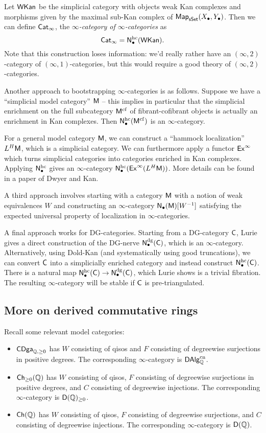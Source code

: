 \documentclass{amsart}
\begin{document}
Let $\mathsf{WKan}$ be the simplicial category with objects weak Kan complexes and morphisms given by the maximal sub-Kan complex of $\mathsf{Map}_{\mathsf{sSet}}(X_\bullet, Y_\bullet)$.
Then we can define $\mathsf{Cat}_\infty$, the \emph{$\infty$-category of $\infty$-categories} as
\[
	\mathsf{Cat}_\infty = \mathsf{N}_\bullet^{\mathrm{hc}}(\mathsf{WKan}).
\]
Note that this construction loses information: we'd really rather have an $(\infty, 2)$-category of $(\infty, 1)$-categories, but this would require a good theory of $(\infty, 2)$-categories.

Another approach to bootstrapping $\infty$-categories is as follows.
Suppose we have a ``simplicial model category'' $\mathsf{M}$ -- this implies in particular that the simplicial enrichment on the full subcategory $\mathsf{M}^{\mathrm{cf}}$ of fibrant-cofibrant objects is actually an enrichment in Kan complexes.
Then $\mathsf{N}_\bullet^{\mathrm{hc}}(\mathsf{M}^{\mathrm{cf}})$ is an $\infty$-category.

For a general model category $\mathsf{M}$, we can construct a ``hammock localization'' $L^H \mathsf{M}$, which is a simplicial category.
We can furthermore apply a functor $\mathsf{Ex}^\infty$ which turns simplicial categories into categories enriched in Kan complexes.
Applying $\mathsf{N}_\bullet^{\mathrm{hc}}$ gives an $\infty$-category $\mathsf{N}_\bullet^{\mathrm{hc}}(\mathsf{Ex}^\infty(L^H \mathsf{M}))$.
More details can be found in a paper of Dwyer and Kan.

A third approach involves starting with a category $\mathsf{M}$ with a notion of weak equivalences $W$ and constructing an $\infty$-category $\mathsf{N}_\bullet(\mathsf{M})[W^{-1}]$ satisfying the expected universal property of localization in $\infty$-categories.

A final approach works for DG-categories.
Starting from a DG-category $\mathsf{C}$, Lurie gives a direct construction of the DG-nerve $\mathsf{N}_\bullet^{\mathrm{dg}}(\mathsf{C})$, which is an $\infty$-category.
Alternatively, using Dold-Kan (and systematically using good truncations), we can convert $\mathsf{C}$ into a simplicially enriched category and instead construct $\mathsf{N}_\bullet^{\mathrm{hc}}(\mathsf{C})$.
There is a natural map $\mathsf{N}_\bullet^{\mathrm{hc}}(\mathsf{C}) \to \mathsf{N}_\bullet^{\mathrm{dg}}(\mathsf{C})$, which Lurie shows is a trivial fibration.
The resulting $\infty$-category will be stable if $\mathsf{C}$ is pre-triangulated.

\subsection{More on derived commutative rings}

Recall some relevant model categories:
\begin{itemize}
	\item $\mathsf{CDga}_{\mathbb{Q},\geq 0}$ has $W$ consisting of qisos and $F$ consisting of degreewise surjections in positive degrees. 
		The corresponding $\infty$-category is $\mathsf{DAlg}_{\mathbb{Q}}^{\mathrm{cn}}$.
	\item $\mathsf{Ch}_{\geq 0}(\mathbb{Q})$ has $W$ consisting of qisos, $F$ consisting of degreewise surjections in positive degrees, and $C$ consisting of degreewise injections.
		The corresponding $\infty$-category is $\mathsf{D}(\mathbb{Q})_{\geq 0}$.
	\item $\mathsf{Ch}(\mathbb{Q})$ has $W$ consisting of qisos, $F$ consisting of degreewise surjections, and $C$ consisting of degreewise injections.
		The corresponding $\infty$-category is $\mathsf{D}(\mathbb{Q})$.
\end{itemize}
\end{document}
